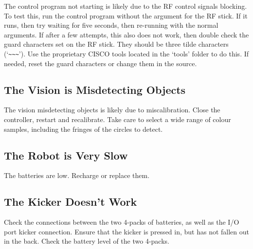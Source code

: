 \documentclass[a4paper]{scrartcl}
\begin{document}
The control program not starting is likely due to the RF control signals
blocking. To test this, run the control program without the argument for the RF
stick. If it runs, then try waiting for five seconds, then re-running with the
normal arguments. If after a few attempts, this also does not work, then double
check the guard characters set on the RF stick. They should be three tilde
characters (`\verb$~~~$'). Use the proprietary CISCO tools located in the
`tools' folder to do this. If needed, reset the guard characters or change them
in the source.

\subsection{The Vision is Misdetecting Objects}

The vision misdetecting objects is likely due to miscalibration. Close the
controller, restart and recalibrate. Take care to select a wide range of colour
samples, including the fringes of the circles to detect.

\subsection{The Robot is Very Slow}

The batteries are low. Recharge or replace them.

\subsection{The Kicker Doesn't Work}

Check the connections between the two 4-packs of batteries, as well as the I/O
port kicker connection. Ensure that the kicker is pressed in, but has not
fallen out in the back. Check the battery level of the two 4-packs.
\end{document}
